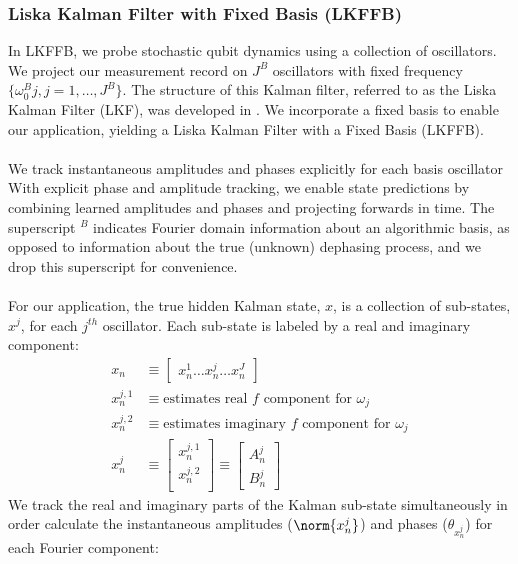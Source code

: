 \subsubsection{Liska Kalman Filter with Fixed Basis (LKFFB)}
In LKFFB, we probe stochastic qubit dynamics using a collection of oscillators.  We project our measurement record on $J^B$ oscillators with fixed frequency $\{ \omega_0^B j, j = 1, \hdots, J^B\}$. The structure of this Kalman filter, referred to as the Liska Kalman Filter (LKF), was developed in \cite{livska2007}. We incorporate a fixed basis to enable our application, yielding a Liska Kalman Filter with a Fixed Basis (LKFFB).
\\
\\
We track instantaneous amplitudes and phases explicitly for each basis oscillator With explicit phase and amplitude tracking, we enable state predictions by combining learned amplitudes and phases and projecting forwards in time. The superscript $ ^B$ indicates Fourier domain information about an algorithmic basis, as opposed to information about the true (unknown) dephasing process, and we drop this superscript for convenience.
\\
\\ 
For our application, the true hidden Kalman state, $x$, is a collection of sub-states, $x^j$, for each $j^{th}$ oscillator. Each sub-state is labeled by a real and imaginary component:
\begin{align}
x_n & \equiv \begin{bmatrix} x^{1}_{n} \hdots x^{j}_{n} \hdots x^{J}_{n} \end{bmatrix} \\
x^{j,1}_{n} & \equiv \text{estimates real $f$ component for $\omega_j$} \\
x^{j,2}_{n} & \equiv \text{estimates imaginary $f$ component for $\omega_j$} \\
x^j_n &\equiv \begin{bmatrix} x^{j,1}_{n} \\ x^{j,2}_{n} \\ \end{bmatrix} \equiv \begin{bmatrix} A^j_{n} \\ B^j_{n}  \end{bmatrix}
\end{align} 
We track the real and imaginary parts of the Kalman sub-state  simultaneously in order calculate the instantaneous amplitudes ($\norm{x^j_n}$) and phases ($\theta_{x^j_n}$)  for each Fourier component:

